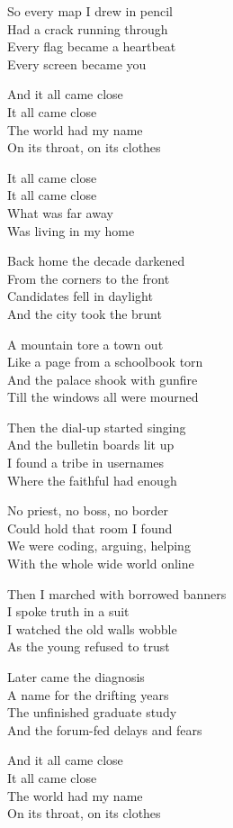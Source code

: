 \begin{lyrics}
So every map I drew in pencil\\
Had a crack running through\\
Every flag became a heartbeat\\
Every screen became you

And it all came close\\
It all came close\\
The world had my name\\
On its throat, on its clothes

It all came close\\
It all came close\\
What was far away\\
Was living in my home

Back home the decade darkened\\
From the corners to the front\\
Candidates fell in daylight\\
And the city took the brunt

A mountain tore a town out\\
Like a page from a schoolbook torn\\
And the palace shook with gunfire\\
Till the windows all were mourned

Then the dial-up started singing\\
And the bulletin boards lit up\\
I found a tribe in usernames\\
Where the faithful had enough

No priest, no boss, no border\\
Could hold that room I found\\
We were coding, arguing, helping\\
With the whole wide world online

Then I marched with borrowed banners\\
I spoke truth in a suit\\
I watched the old walls wobble\\
As the young refused to trust

Later came the diagnosis\\
A name for the drifting years\\
The unfinished graduate study\\
And the forum-fed delays and fears

And it all came close\\
It all came close\\
The world had my name\\
On its throat, on its clothes


\end{lyrics}
